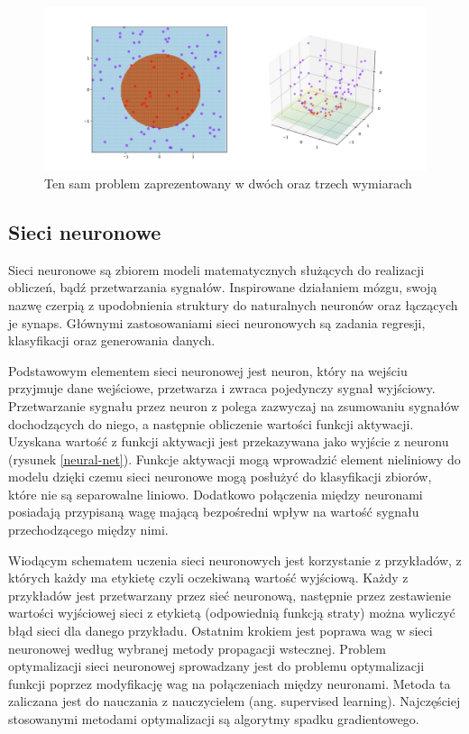 \documentclass[a4paper, twoside, 11pt, openright]{article}
\begin{document}
\begin{figure}[H]
\centering \includegraphics[scale=0.2]{img/svm2.png}
\caption{Ten sam problem zaprezentowany w dwóch oraz trzech wymiarach \cite{wikisvm}}
\label{img:wiki_svm2}
\end{figure}


\subsection{Sieci neuronowe \cite{neural-nets}}

Sieci neuronowe są zbiorem modeli matematycznych służących do realizacji obliczeń, bądź przetwarzania sygnałów. Inspirowane działaniem mózgu, swoją nazwę czerpią z upodobnienia struktury do naturalnych neuronów oraz łączących je synaps. Głównymi zastosowaniami sieci neuronowych są zadania regresji, klasyfikacji oraz generowania danych. 

\bigskip

Podstawowym elementem sieci neuronowej jest neuron, który na wejściu przyjmuje dane wejściowe, przetwarza i zwraca pojedynczy sygnał wyjściowy. Przetwarzanie sygnału przez neuron z polega zazwyczaj na zsumowaniu sygnałów dochodzących do niego, a następnie obliczenie wartości funkcji aktywacji. Uzyskana wartość z funkcji aktywacji jest przekazywana jako wyjście z neuronu (rysunek \ref{neural-net}). Funkcje aktywacji mogą wprowadzić element nieliniowy do modelu dzięki czemu sieci neuronowe mogą posłużyć do klasyfikacji zbiorów, które nie są separowalne liniowo. Dodatkowo połączenia między neuronami posiadają przypisaną wagę mającą bezpośredni wpływ na wartość sygnału przechodzącego między nimi.

\bigskip

Wiodącym schematem uczenia sieci neuronowych jest korzystanie z przykładów, z których każdy ma etykietę czyli oczekiwaną wartość wyjściową. Każdy z przykładów jest przetwarzany przez sieć neuronową, następnie przez zestawienie wartości wyjściowej sieci z etykietą (odpowiednią funkcją straty) można wyliczyć błąd sieci dla danego przykładu. Ostatnim krokiem jest poprawa wag w sieci neuronowej według wybranej metody propagacji wstecznej. Problem optymalizacji sieci neuronowej sprowadzany jest do problemu optymalizacji funkcji poprzez modyfikację wag na połączeniach między neuronami. Metoda ta zaliczana jest do nauczania z nauczycielem (ang. supervised learning). Najczęściej stosowanymi metodami optymalizacji są algorytmy spadku gradientowego. 
\end{document}
